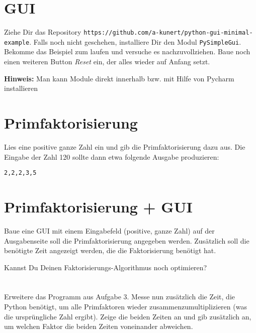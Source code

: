 \documentclass[a4paper]{article}
\begin{document}




\section{GUI}
Ziehe Dir das Repository \texttt{https://github.com/a-kunert/python-gui-minimal-example}. Falls noch nicht geschehen, installiere Dir den Modul \texttt{PySimpleGui}.
Bekomme das Beispiel zum laufen und versuche es nachzuvollziehen. 
Baue noch einen weiteren Button \emph{Reset} ein, der alles wieder auf Anfang setzt. 

\vspace{2pt}

{\footnotesize\textbf{Hinweis:}
	Man kann Module direkt innerhalb bzw. mit Hilfe von Pycharm installieren}


\section{Primfaktorisierung}
Lies eine positive ganze Zahl ein und gib die Primfaktorisierung dazu aus. Die Eingabe der Zahl 120 sollte dann etwa folgende Ausgabe produzieren:

\texttt{2,2,2,3,5}


\section{Primfaktorisierung + GUI}
Baue eine GUI mit einem Eingabefeld (positive, ganze Zahl) auf der Ausgabenseite soll die Primfaktorisierung angegeben werden. Zusätzlich soll die benötigte Zeit angezeigt werden, die die Faktorisierung benötigt hat. 


Kannst Du Deinen Faktorisierungs-Algorithmus noch optimieren? 


\section{}
Erweitere das Programm aus Aufgabe 3. Messe nun zusätzlich die Zeit, die Python benötigt, um alle Primfaktoren wieder zusammenzumultiplizieren (was die ursprüngliche Zahl ergibt). 
Zeige die beiden Zeiten an und gib zusätzlich an, um welchen Faktor die beiden Zeiten voneinander abweichen. 
\end{document}

